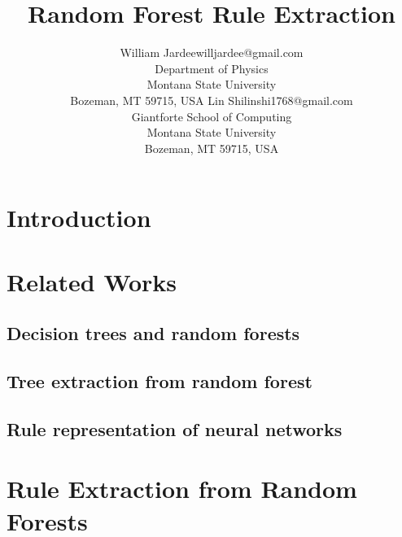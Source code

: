 \documentclass[10pt]{article}
\begin{document}
\title{Random Forest Rule Extraction}

\author{\name William Jardee\email willjardee@gmail.com \\
       \addr Department of Physics\\
       Montana State University\\
       Bozeman, MT 59715, USA\AND
       \name Lin Shi\email linshi1768@gmail.com\\
       \addr Giantforte School of Computing\\
       Montana State University\\
       Bozeman, MT 59715, USA
       }

\maketitle

\begin{abstract}%

\end{abstract}
 
\section{Introduction}
\label{sec:intro}



\section{Related Works}
\label{sec:related works}
\subsection{Decision trees and random forests}

\subsection{Tree extraction from random forest}

\subsection{Rule representation of neural networks}



\section{Rule Extraction from Random Forests}
\label{sec:alg}
\end{document}
